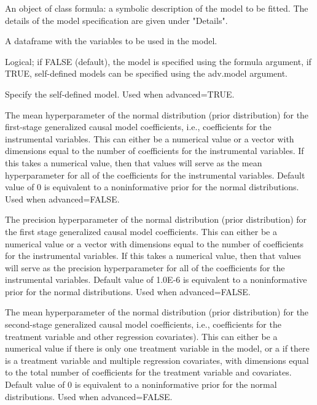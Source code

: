 \documentclass[a4paper]{book}
\begin{document}
%
\begin{Arguments}
\begin{ldescription}
\item[\code{formula}] An object of class formula: a symbolic description of the model to be fitted.
The details of the model specification are given under "Details".

\item[\code{data}] A dataframe with the variables to be used in the model.

\item[\code{advanced}] Logical; if FALSE (default), the model is specified using the formula argument,
if TRUE, self-defined models can be specified using the adv.model argument.

\item[\code{adv.model}] Specify the self-defined model. Used when advanced=TRUE.

\item[\code{b0}] The mean hyperparameter of the normal distribution (prior distribution)
for the first-stage generalized causal model coefficients, i.e., coefficients for the instrumental variables.
This can either be a numerical value or a vector with dimensions equal to the number of coefficients
for the instrumental variables. If this takes a numerical value, then that values will
serve as the mean hyperparameter for all of the coefficients for the instrumental variables.
Default value of 0 is equivalent to a noninformative prior for the normal distributions.
Used when advanced=FALSE.

\item[\code{B0}] The precision hyperparameter of the normal distribution (prior distribution)
for the first stage generalized causal model coefficients.
This can either be a numerical value or a vector with dimensions equal to the number of coefficients
for the instrumental variables. If this takes a numerical value, then that values will
serve as the precision hyperparameter for all of the coefficients for the instrumental variables.
Default value of 1.0E-6 is equivalent to a noninformative prior for the normal distributions.
Used when advanced=FALSE.

\item[\code{g0}] The mean hyperparameter of the normal distribution (prior distribution)
for the second-stage generalized causal model coefficients,
i.e., coefficients for the treatment variable and other regression covariates).
This can either be a numerical value if there is only one treatment variable in the model,
or a if there is a treatment variable and multiple regression covariates,
with dimensions equal to the total number of coefficients for the treatment variable and covariates.
Default value of 0 is equivalent to a noninformative prior for the normal distributions.
Used when advanced=FALSE.


\end{ldescription}
\end{Arguments}
\end{document}
